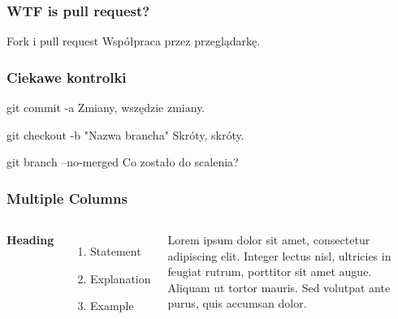 \documentclass[9pt]{beamer}
\begin{document}
	\begin{frame}
		\frametitle{WTF is pull request?}

			\begin{block}{Fork i pull request}
				Współpraca przez przeglądarkę.
			\end{block}			
					
						
	\end{frame}
	
		
	\begin{frame}
		\frametitle{Ciekawe kontrolki}

			\begin{block}{git commit -a}
				Zmiany, wszędzie zmiany.
			\end{block}

			\begin{block}{git checkout -b "Nazwa brancha"}
				Skróty, skróty.
			\end{block}	

			\begin{block}{git branch --no-merged}
				Co zostało do scalenia?
			\end{block}	
			
					
						
	\end{frame}



	
	\begin{frame}
	\frametitle{Multiple Columns}
	\begin{columns}[c] %

	\textbf{Heading}
	\begin{enumerate}
	\item Statement
	\item Explanation
	\item Example
	\end{enumerate}

	Lorem ipsum dolor sit amet, consectetur adipiscing elit. Integer lectus nisl, ultricies in feugiat rutrum, porttitor sit amet augue. Aliquam ut tortor mauris. Sed volutpat ante purus, quis accumsan dolor.

	\end{columns}
	\end{frame}
\end{document}
